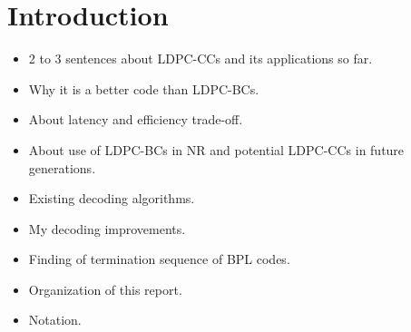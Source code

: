\chapter{Introduction}
\begin{itemize}
  \item 2 to 3 sentences about LDPC-CCs and its applications so far.
  \item Why it is a better code than LDPC-BCs.
  \item About latency and efficiency trade-off.
  \item About use of LDPC-BCs in NR and potential LDPC-CCs in future generations.
  \item Existing decoding algorithms.
  \item My decoding improvements.
  \item Finding of termination sequence of BPL codes.
  \item Organization of this report.
  \item Notation.
\end{itemize}